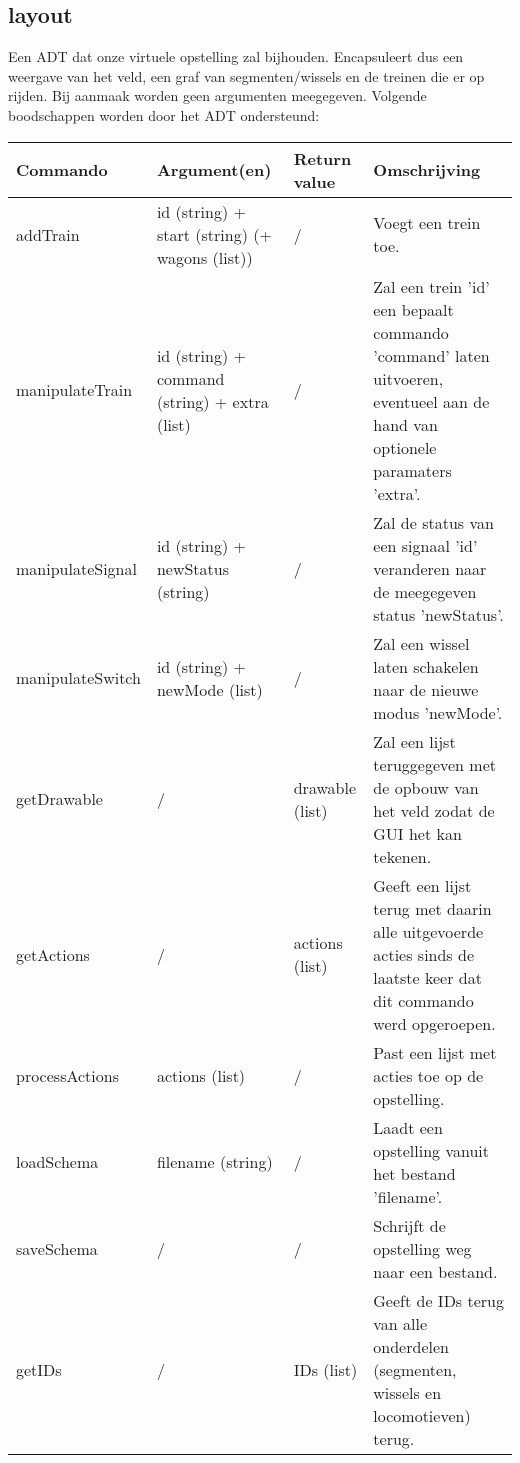 \documentclass{article}
\begin{document}
\subsection{layout}
Een ADT dat onze virtuele opstelling zal bijhouden. Encapsuleert dus een weergave van het veld, een graf van segmenten/wissels en de treinen die er op rijden. Bij aanmaak worden geen argumenten meegegeven.
Volgende boodschappen worden door het ADT ondersteund:
\begin{center}
    \begin{tabular}{ | l | p{4cm} | l | p{6cm} |}
    \hline
    Commando & Argument(en) & Return value & Omschrijving \\ \hline
    addTrain & id (string) + start (string) (+ wagons (list)) & / & Voegt een trein toe. \\ \hline
    manipulateTrain & id (string) + command (string) + extra (list) & / & Zal een trein 'id' een bepaalt commando 'command' laten uitvoeren, eventueel aan de hand van optionele paramaters 'extra'. \\ \hline
    manipulateSignal & id (string) + newStatus (string) & / & Zal de status van een signaal 'id' veranderen naar de meegegeven status 'newStatus'. \\ \hline
    manipulateSwitch & id (string) + newMode (list) & / & Zal een wissel laten schakelen naar de nieuwe modus 'newMode'. \\ \hline
    getDrawable & / & drawable (list) & Zal een lijst teruggegeven met de opbouw van het veld zodat de GUI het kan tekenen. \\ \hline
    getActions & / & actions (list) & Geeft een lijst terug met daarin alle uitgevoerde acties sinds de laatste keer dat dit commando werd opgeroepen. \\ \hline
    processActions & actions (list) & / & Past een lijst met acties toe op de opstelling. \\ \hline
    loadSchema & filename (string) & / & Laadt een opstelling vanuit het bestand 'filename'. \\ \hline
    saveSchema & / & / & Schrijft de opstelling weg naar een bestand. \\ \hline
    getIDs & / & IDs (list) & Geeft de IDs terug van alle onderdelen (segmenten, wissels en locomotieven) terug. \\ \hline
    \end{tabular}
\end{center}
\end{document}
